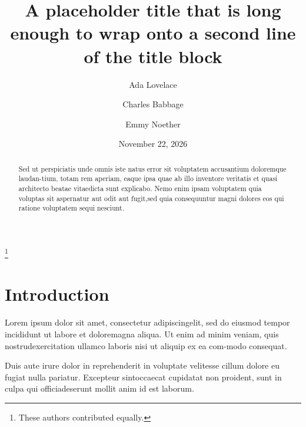 \documentclass[reprint,aps,pra,superscriptaddress,10pt,nofootinbib,nobalancelastpage,preprintnumbers]{revtex4-2}
\begin{document}
\title{A placeholder title that is long enough to wrap onto a second line of the title block}
\author{Ada Lovelace}
\thanks{These authors contributed equally.}
\author{Charles Babbage}
\author{Emmy Noether}
\date{November 22, 2026}
\begin{abstract}
Sed ut perspiciatis unde omnis iste natus error sit voluptatem accusantium doloremque laudan-\linebreak tium, totam rem aperiam, eaque ipsa quae ab illo inventore veritatis et quasi architecto beatae vitae\linebreak dicta sunt explicabo. Nemo enim ipsam voluptatem quia voluptas sit aspernatur aut odit aut fugit,\linebreak sed quia consequuntur magni dolores eos qui ratione voluptatem sequi nesciunt.
\end{abstract}
\maketitle
\section{Introduction}
Lorem ipsum dolor sit amet, consectetur adipiscing\linebreak elit, sed do eiusmod tempor incididunt ut labore et dolore\linebreak magna aliqua. Ut enim ad minim veniam, quis nostrud\linebreak exercitation ullamco laboris nisi ut aliquip ex ea com-\linebreak modo consequat.

Duis aute irure dolor in reprehenderit in voluptate velit\linebreak esse cillum dolore eu fugiat nulla pariatur. Excepteur sint\linebreak occaecat cupidatat non proident, sunt in culpa qui officia\linebreak deserunt mollit anim id est laborum.
\end{document}
